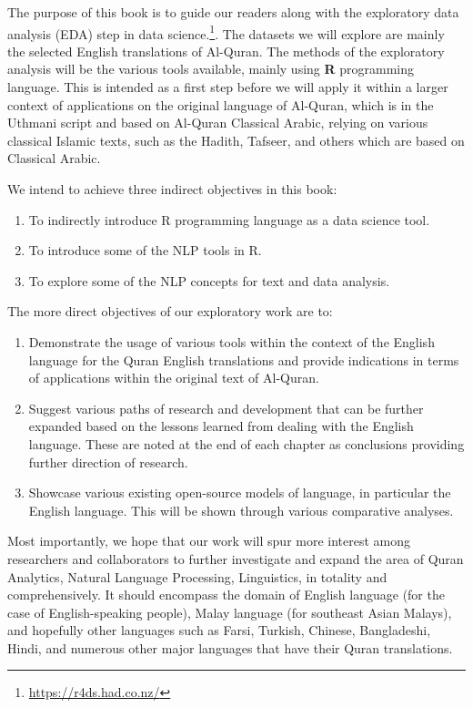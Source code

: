 \documentclass[
]{article}
\providecommand{\tightlist}{%
  \setlength{\itemsep}{0pt}\setlength{\parskip}{0pt}}
\begin{document}
The purpose of this book is to guide our readers along with the exploratory data analysis (EDA) step in data science.\footnote{\url{https://r4ds.had.co.nz/}}. The datasets we will explore are mainly the selected English translations of Al-Quran. The methods of the exploratory analysis will be the various tools available, mainly using \textbf{R} programming language. This is intended as a first step before we will apply it within a larger context of applications on the original language of Al-Quran, which is in the Uthmani script and based on Al-Quran Classical Arabic, relying on various classical Islamic texts, such as the Hadith, Tafseer, and others which are based on Classical Arabic.

We intend to achieve three indirect objectives in this book:

\begin{enumerate}
\def\labelenumi{\arabic{enumi}.}
\tightlist
\item
  To indirectly introduce R programming language as a data science tool.
\item
  To introduce some of the NLP tools in R.
\item
  To explore some of the NLP concepts for text and data analysis.
\end{enumerate}

The more direct objectives of our exploratory work are to:

\begin{enumerate}
\def\labelenumi{\arabic{enumi}.}
\tightlist
\item
  Demonstrate the usage of various tools within the context of the English language for the Quran English translations and provide indications in terms of applications within the original text of Al-Quran.
\item
  Suggest various paths of research and development that can be further expanded based on the lessons learned from dealing with the English language. These are noted at the end of each chapter as conclusions providing further direction of research.
\item
  Showcase various existing open-source models of language, in particular the English language. This will be shown through various comparative analyses.
\end{enumerate}

Most importantly, we hope that our work will spur more interest among researchers and collaborators to further investigate and expand the area of Quran Analytics, Natural Language Processing, Linguistics, in totality and comprehensively. It should encompass the domain of English language (for the case of English-speaking people), Malay language (for southeast Asian Malays), and hopefully other languages such as Farsi, Turkish, Chinese, Bangladeshi, Hindi, and numerous other major languages that have their Quran translations.
\end{document}
